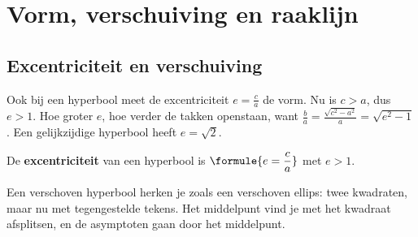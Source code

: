 
\begin{oefeningen}
\end{oefeningen}

\section{Vorm, verschuiving en raaklijn}

\subsection{Excentriciteit en verschuiving}

Ook bij een hyperbool meet de excentriciteit $e = \tfrac ca$ de vorm. Nu is $c > a$, dus $e > 1$. Hoe groter $e$, hoe verder de takken openstaan, want $\tfrac ba = \tfrac{\sqrt{c^2 - a^2}}{a} = \sqrt{e^2 - 1}$. Een gelijkzijdige hyperbool heeft $e = \sqrt2$.

\begin{theorie}
De \textbf{\textcolor{accent}{excentriciteit}} van een hyperbool is \qquad $\formule{e = \dfrac ca}$ \qquad met $e > 1$.
\end{theorie}

Een verschoven hyperbool herken je zoals een verschoven ellips: twee kwadraten, maar nu met tegengestelde tekens. Het middelpunt vind je met het kwadraat afsplitsen, en de asymptoten gaan door het middelpunt.

